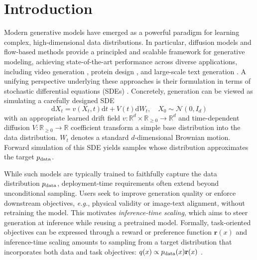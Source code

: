 \documentclass{article}
\theoremstyle{plain}
\theoremstyle{definition}
\theoremstyle{remark}
\newcommand{\yinuo}[1]{{\color{cyan}[yinuo: #1]}}
\newcommand{\dif}{{\mathrm{d}}}
\newcommand{\R}{{\mathbb{R}}}
\begin{document}
\section{Introduction}
Modern generative models have emerged as a powerful paradigm for learning complex, high-dimensional data distributions. In particular, diffusion models \cite{ho2020denoising,sohl2015deep,song2019generative,song2020score} and flow-based methods \cite{zhang2018monge,lipman2022flow,albergo2022building,liu2022flow} provide a principled and scalable framework for generative modeling, achieving state-of-the-art performance across diverse applications, including video generation \cite{ho2022video}, protein design \cite{gruver2023protein}, and large-scale text generation \cite{li2022diffusion,nie2025large}. A unifying perspective underlying these approaches is their formulation in terms of stochastic differential equations (SDEs) \cite{song2020score,lipman2022flow,albergo2025stochastic,liu2022flow}. Concretely, generation can be viewed as simulating a carefully designed SDE
\[
\dif X_t = v(X_t,t)\dif t + V(t)\dif W_t, \quad X_0\sim \mathcal N(0,I_d)
\]
with an appropriate learned drift field $v:\R^d\times\R_{\geq0}\rightarrow \R^d$ and time-dependent diffusion $V:\R_{\geq0}\rightarrow \R$ coefficient transform a simple base distribution into the data distribution. \(W_t\) denotes a standard \(d\)-dimensional Brownian motion. Forward simulation of this SDE yields samples whose distribution approximates the target $p_{\rm data}$. 

While such models are typically trained to faithfully capture the data distribution  $p_{\rm data}$, deployment-time requirements often extend beyond unconditional sampling. Users seek to improve generation quality or enforce downstream objectives, \emph{e.g.}, physical validity or image-text alignment, without retraining the model. This motivates \emph{inference-time scaling}, which aims to steer generation at inference while reusing a pretrained model. Formally, task-oriented objectives can be expressed through a reward or preference function $\mathbf{r}(x)$ and inference-time scaling amounts to sampling from a target distribution that incorporates both data and task objectives: \(q(x) \propto p_{\rm data}(x) \mathbf{r}(x)\) \cite{uehara2025inference}. 

\end{document}
